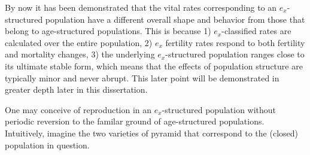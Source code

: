  \FloatBarrier
\label{sec:exstructuredrenewal}
By now it has been demonstrated that the vital rates corresponding to an
$e_x$-structured population have a different overall shape and behavior from
those that belong to age-structured populations. This is because 1) $e_x$-classified rates
are calculated over the entire population, 2) $e_x$ fertility rates respond to
both fertility and mortality changes, 3) the underlying $e_x$-structured
population ranges close to its ultimate stable form, which means that
the effects of population structure are typically minor and never abrupt. This
later point will be demonstrated in greater depth later in this dissertation.

One may conceive of reproduction in an $e_x$-structured population without
periodic reversion to the familar ground of age-structured populations.
Intuitively, imagine the two varieties of pyramid that correspond to the
(closed) population in question. 